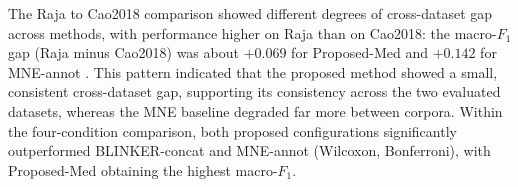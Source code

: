 The Raja to Cao2018 comparison showed different degrees of cross-dataset gap across methods, with performance higher on Raja than on Cao2018: the macro-$F_1$ gap (Raja minus Cao2018) was about $+0.069$ for Proposed-Med and $+0.142$ for MNE-annot \citep{cao2019multichannel}. This pattern indicated that the proposed method showed a small, consistent cross-dataset gap, supporting its consistency across the two evaluated datasets, whereas the MNE baseline degraded far more between corpora. Within the four-condition comparison, both proposed configurations significantly outperformed BLINKER-concat and MNE-annot (Wilcoxon, Bonferroni), with Proposed-Med obtaining the highest macro-$F_1$.
